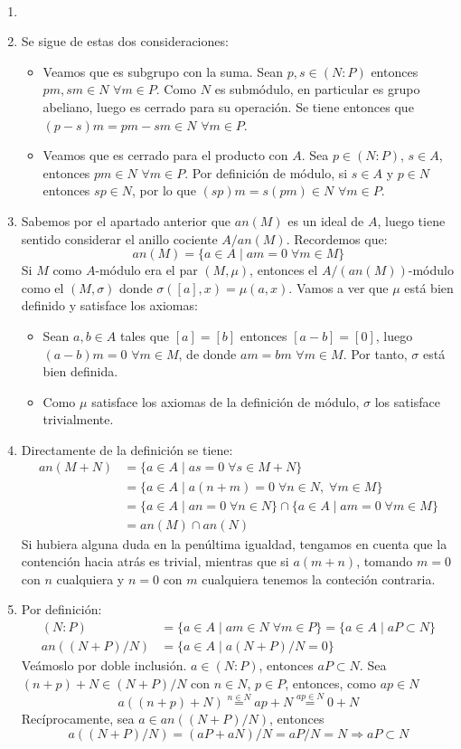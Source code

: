 \documentclass[twoside]{article}
\begin{document}
\begin{solucion}\
\begin{enumerate}
\item[]
\item Se sigue de estas dos consideraciones:
\begin{itemize}
\item Veamos que es subgrupo con la suma. Sean $p,s\in (N:P)$ entonces $pm,sm\in N$ $\forall m \in P$. Como $N$ es submódulo, en particular es grupo abeliano, luego es cerrado para su operación. Se tiene entonces que $(p-s)m=pm-sm \in N$ $\forall m\in P$. 
\item Veamos que es cerrado para el producto con $A$. Sea $p\in (N:P)$, $s\in A$, entonces $pm\in N$ $\forall m\in P$. Por definición de módulo, si $s\in A$ y $p\in N$ entonces $sp\in N$, por lo que $(sp)m=s(pm)\in N$ $\forall m \in P$.
\end{itemize}
\newpage
\item Sabemos por el apartado anterior que $an(M)$ es un ideal de $A$, luego tiene sentido considerar el anillo cociente $A/an(M)$. Recordemos que:
$$
an(M) = \{a \in A\mid am = 0 \; \forall m\in M\}
$$
Si $M$ como $A$-módulo era el par $(M,\mu)$, entonces el $A/(an(M))$-módulo como el $(M,\sigma)$ donde $\sigma([a],x)=\mu(a,x)$. Vamos a ver que $\mu$ está bien definido y satisface los axiomas:
\begin{itemize}
\item Sean $a,b\in A$ tales que $[a]=[b]$ entonces $[a-b]=[0]$, luego $(a-b
)m=0$ $\forall m \in M$, de donde $am=bm$ $\forall m\in M$. Por tanto, $\sigma$ está bien definida.
\item Como $\mu$ satisface los axiomas de la definición de módulo, $\sigma$ los satisface trivialmente.
\end{itemize}
\item Directamente de la definición se tiene:
\begin{align*}
an(M+N) &= \{a \in A\mid as = 0 \; \forall s\in M+N\} \\
&= \{a \in A\mid a(n+m) = 0 \; \forall n\in N,\; \forall m\in M\}\\
&= \{a \in A\mid an= 0 \; \forall n\in N\}\cap \{a \in A\mid am = 0 \; \forall m\in M\}\\
&=an(M)\cap an(N)
\end{align*}
Si hubiera alguna duda en la penúltima igualdad, tengamos en cuenta que la contención hacia atrás es trivial, mientras que si $a(m+n)$, tomando $m=0$ con $n$ cualquiera y $n=0$ con $m$ cualquiera tenemos la conteción contraria.
\item Por definición:
\begin{align*}
(N:P) &= \{a\in A\mid am\in N \;\forall m \in P\}=\{a\in A\mid aP\subset N \}\\
an((N+P)/N)&= \{a \in A\mid a(N+P)/N = 0 \} 
\end{align*}
Veámoslo por doble inclusión. $a\in (N:P)$, entonces $aP\subset N$. Sea $(n+p)+N \in (N+P)/N$ con $n\in N$, $p\in P$, entonces, como $ap\in N$
$$a((n+p)+N) \overset{n\in N}{=} ap+N \overset{ap\in N}{=} 0+N
$$
Recíprocamente, sea $a\in an((N+P)/N)$, entonces 
$$a((N+P)/N)= (aP+aN)/N = aP/N = N \Rightarrow aP \subset N$$
\end{enumerate}


\end{solucion}
\end{document}
